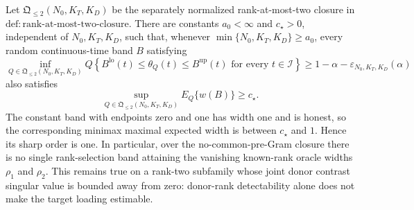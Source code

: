 Let \(\mathfrak Q_{\leq2}(N_0,K_T,K_D)\) be the separately normalized
rank-at-most-two closure in
\(\mathrm{def:rank\mbox{-}at\mbox{-}most\mbox{-}two\mbox{-}closure}\).  There are
constants \(a_0<\infty\) and \(c_\star>0\), independent of
\(N_0,K_T,K_D\), such that, whenever
\(\min\{N_0,K_T,K_D\}\geq a_0\), every random continuous-time band \(B\)
satisfying
\[
\inf_{Q\in\mathfrak Q_{\leq2}(N_0,K_T,K_D)}
Q\left\{B^{\mathrm{lo}}(t)\leq\theta_Q(t)\leq B^{\mathrm{up}}(t)
\text{ for every }t\in\mathcal I\right\}
\geq1-\alpha-\varepsilon_{N_0,K_T,K_D}(\alpha)
\]
also satisfies
\[
\sup_{Q\in\mathfrak Q_{\leq2}(N_0,K_T,K_D)}E_Q\{w(B)\}\geq c_\star.
\]
The constant band with endpoints zero and one has width one and is honest, so the
corresponding minimax maximal expected width is between \(c_\star\) and \(1\).
Hence its sharp order is one.  In particular, over the no-common-pre-Gram closure
there is no single rank-selection band attaining the vanishing known-rank oracle
widths \(\rho_1\) and \(\rho_2\).  This remains true on a rank-two subfamily whose
joint donor contrast singular value is bounded away from zero: donor-rank
detectability alone does not make the target loading estimable.